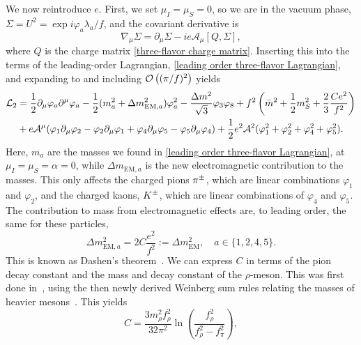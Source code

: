 We now reintroduce $e$.
First, we set $\mu_I = \mu_S = 0$, so we are in the vacuum phase, $\Sigma = U^2 = \exp{i \varphi_a \lambda_a/f}$, and the covariant derivative is
%
\begin{equation}
    \nabla_\mu \Sigma = \partial_\mu \Sigma - i e \mathcal A_\mu [Q, \Sigma],
\end{equation}
%
where $Q$ is the charge matrix \autoref{three-flavor charge matrix}.
Inserting this into the terms of the leading-order Lagrangian, \autoref{leading order three-flavor Lagrangian}, and expanding to and including $\mathcal O\left((\pi/f)^2\right)$ yields
%
\begin{align}
    \nonumber
    \mathcal{L}_2
    &= 
    \frac{1}{2} \partial_\mu \varphi_a \partial^\mu \varphi_a
    - \frac{1}{2}(m_{a}^2 + \Delta m_{\text{EM},a}^2)\varphi_a^2
    - \frac{\Delta m^2}{\sqrt 3} \varphi_3 \varphi_8
    + f^2 \left(\bar m^2 + \frac{1}{2} m_S^2 + \frac{2}{3}\frac{C e^2}{f^2}\right)\\
    &+ e \mathcal A^\mu 
    (
        \varphi_1 \partial_\mu \varphi_2
        - \varphi_2 \partial_\mu \varphi_1
        + \varphi_4 \partial_\mu \varphi_5
        - \varphi_5 \partial_\mu \varphi_4
    )
    + \frac{1}{2} e^2 \mathcal A^2 (\varphi_1^2 +\varphi_2^2 + \varphi_4^2 +\varphi_5^2).
\end{align}
%
Here, $m_{a}$ are the masses  we found in \autoref{leading order three-flavor Lagrangian}, at $\mu_I = \mu_S = \alpha = 0$, while $\Delta m_{\text{EM}, a}$ is the new electromagnetic contribution to the masses.
This only affects the charged pions ${\pi^\pm}$, which are linear combinations $\varphi_1$ and $\varphi_2$, and the charged kaons, ${K^\pm}$, which are linear combinations of $\varphi_4$ and $\varphi_5$.
The contribution to mass from electromagnetic effects are, to leading order, the same for these particles,
%
\begin{equation}
    \Delta m_{\text{EM}, a}^2 = 2C \frac{e^2}{f^2} := \Delta m^2_\text{EM}, \quad a \in \{1, 2, 4, 5\}.
\end{equation}
%
This is known as Dashen's theorem~\autocite{dashenChiralMathrmSUEnsuremath1969}.
We can express $C$ in terms of the pion decay constant and the mass and decay constant of the $\rho$-meson.
This was first done in~\autocite{dasElectromagneticMassDifference1967}, using the then newly derived Weinberg sum rules relating the masses of heavier mesons~\autocite{weinbergPreciseRelationsSpectra1967}.
This yields
%
\begin{equation}
    \label{C from rho}
    C = \frac{3 m_\rho^2 f_\rho^2}{32 \pi^2} 
    \ln\left(  \frac{f_\rho^2}{f_\rho^2 - f_\pi^2}  \right),
\end{equation}
